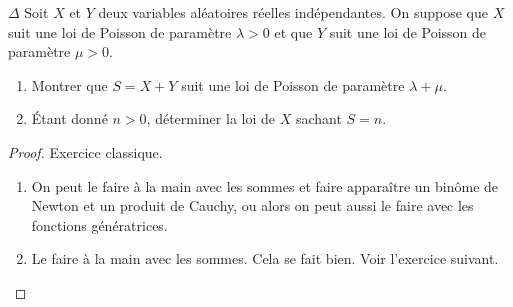 \documentclass[french,a4paper]{article}
\theoremstyle{plain}
\theoremstyle{definition}
\theoremstyle{remark}
\begin{document}
\begin{ex}{$\Delta$}
	Soit $X$ et $Y$ deux variables aléatoires réelles indépendantes. On suppose que $X$ suit une loi de Poisson de paramètre $\lambda>0$ et que $Y$ suit une loi de Poisson de paramètre $\mu>0$.
	\begin{enumerate}
		\item Montrer que $S=X+Y$ suit une loi de Poisson de paramètre $\lambda+\mu$.
		\item Étant donné $n>0$, déterminer la loi de $X$ sachant $S=n$.
	\end{enumerate}
\end{ex}
\begin{proof}
	Exercice classique.
	\begin{enumerate}
		\item On peut le faire à la main avec les sommes et faire apparaître un binôme de Newton et un produit de Cauchy, ou alors on peut aussi le faire avec les fonctions génératrices.
		\item Le faire à la main avec les sommes. Cela se fait bien. Voir l'exercice suivant.
	\end{enumerate}
\end{proof}
\end{document}
